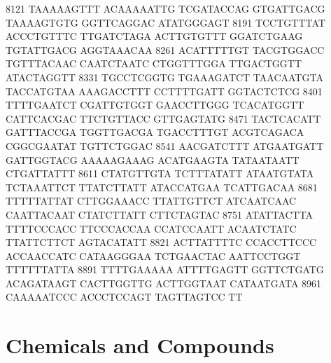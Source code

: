 \begin{addmargin}{0.025\textwidth}
\begin{footnotesize}
\begin{LVerbatim}[commandchars=\\\{\}]
\color{red}8121 TAAAAAGTTT ACAAAAATTG TCGATACCAG GTGATTGACG TAAAAGTGTG GGTTCAGGAC ATATGGGAGT
\color{red}8191 TCCTGTTTAT ACCCTGTTTC TTGATCTAGA ACTTGTGTTT GGATCTGAAG TGTATTGACG AGGTAAACAA
\color{red}8261 ACATTTTTGT TACGTGGACC TGTTTACAAC CAATCTAATC CTGGTTTGGA TTGACTGGTT ATACTAGGTT
\color{red}8331 TGCCTCGGTG TGAAAGATCT TAACAATGTA TACCATGTAA AAAGACCTTT CCTTTTGATT GGTACTCTCG
\color{red}8401 TTTTGAATCT CGATTGTGGT GAACCTTGGG TCACATGGTT CATTCACGAC TTCTGTTACC GTTGAGTATG
\color{red}8471 TACTCACATT GATTTACCGA TGGTTGACGA TGACCTTTGT ACGTCAGACA CGGCGAATAT TGTTCTGGAC
\color{red}8541 AACGATCTTT ATGAATGATT GATTGGTACG AAAAAGAAAG ACATGAAGTA TATAATAATT CTGATTATTT
\color{red}8611 CTATGTTGTA TCTTTATATT ATAATGTATA TCTAAATTCT TTATCTTATT ATACCATGAA TCATTGACAA
\color{red}8681 TTTTTATTAT CTTGGAAACC TTATTGTTCT ATCAATCAAC CAATTACAAT CTATCTTATT CTTCTAGTAC
\color{red}8751 ATATTACTTA TTTTCCCACC TTCCCACCAA CCATCCAATT ACAATCTATC TTATTCTTCT AGTACATATT
\color{red}8821 ACTTATTTTC CCACCTTCCC ACCAACCATC CATAAGGGAA TCTGAACTAC AATTCCTGGT TTTTTTATTA
\color{red}8891 TTTTGAAAAA ATTTTGAGTT GGTTCTGATG ACAGATAAGT CACTTGGTTG ACTTGGTAAT CATAATGATA
\color{red}8961 CAAAAATCCC ACCCT\color{black}CCAGT TAGTTAGTCC TT 
\end{LVerbatim}
\end{footnotesize}

\end{addmargin}






\section{Chemicals and Compounds}

